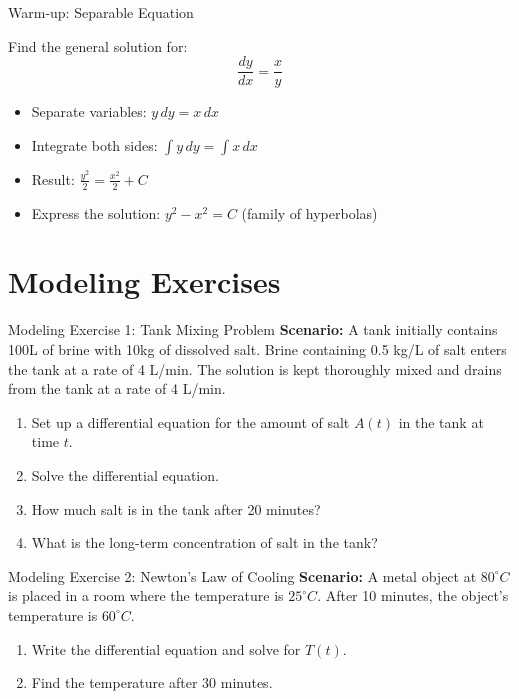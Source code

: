 \documentclass[10pt,aspectratio=169]{beamer}
\newcommand{\concept}[1]{\textbf{#1}}
\newcommand{\formula}[1]{\textit{#1}}
\begin{document}
\begin{frame}{Warm-up: Separable Equation}
    \begin{problembox}
        Find the general solution for:
        \formula{\[ \frac{dy}{dx} = \frac{x}{y} \]}
    \end{problembox}
    
    \begin{solutionbox}
        \begin{itemize}
            \item Separate variables: $y \, dy = x \, dx$
            \item Integrate both sides: $\int y \, dy = \int x \, dx$
            \item Result: $\frac{y^2}{2} = \frac{x^2}{2} + C$
            \item Express the solution: $y^2 - x^2 = C$ (family of hyperbolas)
        \end{itemize}
    \end{solutionbox}
\end{frame}

\section{Modeling Exercises}
\begin{frame}{Modeling Exercise 1: Tank Mixing Problem}
    \concept{Scenario:} A tank initially contains 100L of brine with 10kg of dissolved salt. Brine containing 0.5 kg/L of salt enters the tank at a rate of 4 L/min. The solution is kept thoroughly mixed and drains from the tank at a rate of 4 L/min.
    \begin{enumerate}
        \item Set up a differential equation for the amount of salt $A(t)$ in the tank at time $t$.
        \item Solve the differential equation.
        \item How much salt is in the tank after 20 minutes?
        \item What is the long-term concentration of salt in the tank?
    \end{enumerate}
\end{frame}

\begin{frame}{Modeling Exercise 2: Newton's Law of Cooling}
    \concept{Scenario:} A metal object at $80^\circ C$ is placed in a room where the temperature is $25^\circ C$. After 10 minutes, the object's temperature is $60^\circ C$.
    \begin{enumerate}
        \item Write the differential equation and solve for $T(t)$.
        \item Find the temperature after 30 minutes.
    \end{enumerate}
\end{frame}
\end{document}
